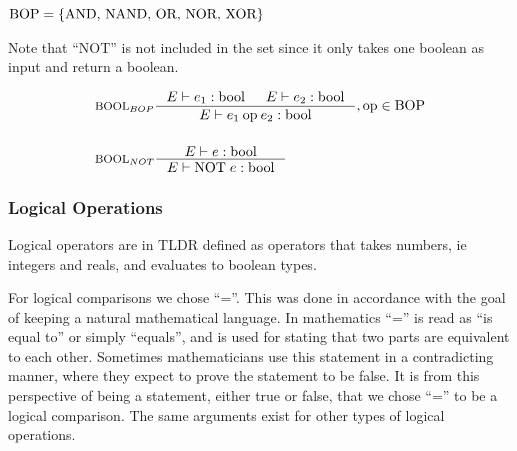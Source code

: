 \begin{center}
$\text{BOP} = \left\{ {\text{AND, NAND, OR, NOR, XOR}} \right\}$
\end{center}

Note that \enquote{NOT} is not included in the set since it only takes one boolean as input and return a boolean.

\begin{align*}
&\inference[$\text{BOOL}_{BOP}$]{\Tenv e_1 : \Tbool &
                       \Tenv e_2 : \Tbool}
                    {\Tenv e_1 \mathbin{\text{op}} e_2 : \Tbool}, \text{op} \in \Tbop
\\\\
&\inference[$\text{BOOL}_{NOT}$]{\Tenv e : \Tbool}
                    {\Tenv \mathbin{\text{NOT}} \; e : \Tbool}
\end{align*}


\subsubsection{Logical Operations}
\label{sec:logicOps}

Logical operators are in TLDR defined as operators that takes numbers, ie integers and reals, and evaluates to boolean types.

For logical comparisons we chose \enquote{=}. This was done in accordance with the goal of keeping a natural mathematical language. In mathematics \enquote{=} is read as \enquote{is equal to} or simply \enquote{equals}, and is used for stating that two parts are equivalent to each other. Sometimes mathematicians use this statement in a contradicting manner, where they expect to prove the statement to be false. It is from this perspective of being a statement, either true or false, that we chose \enquote{=} to be a logical comparison. The same arguments exist for other types of logical operations.

